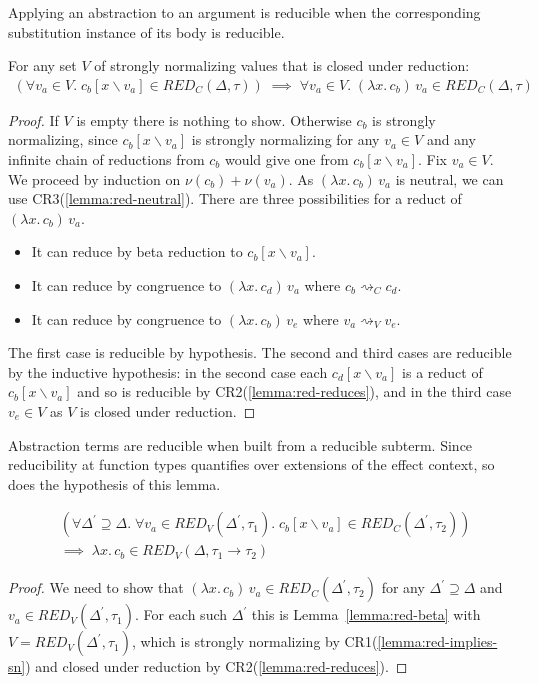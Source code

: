 \documentclass[acmsmall, screen, review, anonymous]{acmart}
\theoremstyle{definition}
\newcommand{\arr}{\rightarrow}
\newcommand{\abs}[2]{\lambda#1.\,#2}
\newcommand{\app}[2]{#1\,#2}
\newcommand{\sub}[2]{[#1\backslash#2]}
\newcommand{\sbst}[3]{#1\sub{#2}{#3}}
\newcommand{\stepstoname}{\rightsquigarrow}
\newcommand{\stepstov}{\stepstoname_V}
\newcommand{\stepstoc}{\stepstoname_C}
\newcommand{\bound}[1]{\nu(#1)}
\newcommand{\redname}{RED}
\newcommand{\redvname}{\redname_{V}}
\newcommand{\redv}[2]{\redvname{({#1},{#2})}}
\newcommand{\redcname}{\redname_{C}}
\newcommand{\redc}[2]{\redcname{({#1},{#2})}}
\begin{document}
Applying an abstraction to an argument is reducible when the
corresponding substitution instance of its body is reducible.
\begin{lemma}
\label{lemma:red-beta}
For any set $V$ of strongly normalizing values that is closed under
reduction:
\begin{align*}
  (\forall v_a \in V. \; \sbst{c_b}{x}{v_a} \in \redc{\Delta}{\tau})
  \; \implies \;
  \forall v_a \in V. \; \app{(\abs{x}{c_b})}{v_a} \in \redc{\Delta}{\tau}
\end{align*}
\end{lemma}
\begin{proof}
  If $V$ is empty there is nothing to show. Otherwise $c_b$ is
  strongly normalizing, since $\sbst{c_b}{x}{v_a}$ is strongly
  normalizing for any $v_a \in V$ and any infinite chain of reductions
  from $c_b$ would give one from $\sbst{c_b}{x}{v_a}$. Fix
  $v_a \in V$. We proceed by induction on
  $\bound{c_b} + \bound{v_a}$. As $\app{(\abs{x}{c_b})}{v_a}$ is neutral,
  we can use CR3(\ref{lemma:red-neutral}). There are three possibilities for a
  reduct of $\app{(\abs{x}{c_b})}{v_a}$.
  \begin{itemize}
  \item It can reduce by beta reduction to $\sbst{c_b}{x}{v_a}$.
  \item It can reduce by congruence to $\app{(\abs{x}{c_d})}{v_a}$ where $c_b \stepstoc c_d$.
  \item It can reduce by congruence to $\app{(\abs{x}{c_b})}{v_e}$ where $v_a \stepstov v_e$.
  \end{itemize}
  The first case is reducible by hypothesis. The second and third cases
  are reducible by the inductive hypothesis: in the second case each
  $\sbst{c_d}{x}{v_a}$ is a reduct of $\sbst{c_b}{x}{v_a}$ and so is
  reducible by CR2(\ref{lemma:red-reduces}), and in the third case
  $v_e \in V$ as $V$ is closed under reduction.
\end{proof}

Abstraction terms are reducible when built from a reducible subterm.
Since reducibility at function types quantifies over extensions of
the effect context, so does the hypothesis of this lemma.
\begin{lemma}
\label{lemma:red-abs}
\begin{align*}
  &(\forall \Delta^{\prime} \supseteq \Delta. \;
    \forall v_a \in \redv{\Delta^{\prime}}{\tau_1}. \;
    \sbst{c_b}{x}{v_a} \in \redc{\Delta^{\prime}}{\tau_2}) \\
  &\implies \; \abs{x}{c_b} \in \redv{\Delta}{\tau_1 \arr \tau_2}
\end{align*}
\end{lemma}
\begin{proof}
  We need to show that
  $\app{(\abs{x}{c_b})}{v_a} \in \redc{\Delta^{\prime}}{\tau_2}$ for any
  $\Delta^{\prime} \supseteq \Delta$ and
  $v_a \in \redv{\Delta^{\prime}}{\tau_1}$. For each such
  $\Delta^{\prime}$ this is Lemma~\ref{lemma:red-beta} with
  $V = \redv{\Delta^{\prime}}{\tau_1}$, which is strongly normalizing
  by CR1(\ref{lemma:red-implies-sn}) and closed under reduction by
  CR2(\ref{lemma:red-reduces}).
\end{proof}
\end{document}

